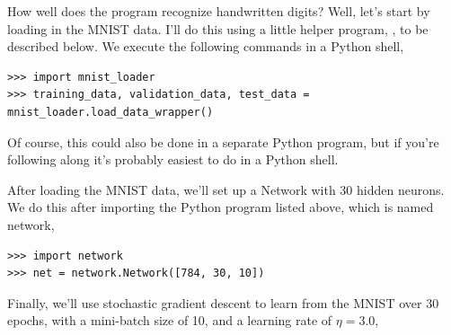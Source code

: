 \documentclass[a4paper,twoside,10pt]{book}
\begin{document}
How well does the program recognize handwritten digits? Well, let's start by loading in the MNIST data. I'll do this using a little helper program, , to be described below. We execute the following commands in a Python shell,
\begin{lstlisting}
>>> import mnist_loader
>>> training_data, validation_data, test_data = mnist_loader.load_data_wrapper()
\end{lstlisting}
Of course, this could also be done in a separate Python program, but if you're following along it's probably easiest to do in a Python shell.

After loading the MNIST data, we'll set up a Network with 30 hidden neurons. We do this after importing the Python program listed above, which is named network,

%
\begin{lstlisting}
>>> import network
>>> net = network.Network([784, 30, 10])
\end{lstlisting}
Finally, we'll use stochastic gradient descent to learn from the MNIST  over 30 epochs, with a mini-batch size of 10, and a learning rate of $\eta=3.0$,
\end{document}
